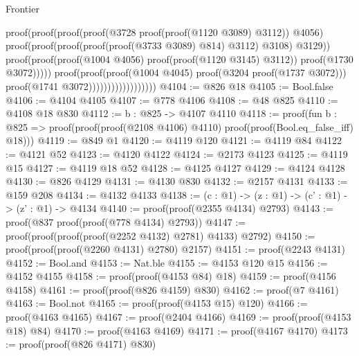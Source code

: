 \begin{lexlean}{Frontier}
\begin{coremodule}
                                                        proof(proof(proof(proof(@3728
                                                                  proof(proof(@1120 @3089) @3112))
                                                                @4056)
                                                              proof(proof(proof(proof(proof(@3733
                                                                          @3089)
                                                                        @814)
                                                                      @3112)
                                                                    @3108)
                                                                  @3129))
                                                            proof(proof(proof(@1004 @4056)
                                                                  proof(proof(@1120 @3145) @3112))
                                                                proof(@1730 @3072)))))
                                                  proof(proof(proof(@1004 @4045)
                                                        proof(@3204 proof(@1737 @3072)))
                                                      proof(@1741 @3072))))))))))))))))))
@4104 := @826 @18
@4105 := Bool.false
@4106 := @4104 @4105
@4107 := @778 @4106
@4108 := @48 @825
@4110 := @4108 @18 @830
@4112 := {b : @825} -> @4107 @4110
@4118 := proof(fun {b : @825} =>
    proof(proof(proof(@2108 @4106) @4110) proof(proof(Bool.eq_false_iff) @18)))
@4119 := @849 @1
@4120 := @4119 @120
@4121 := @4119 @84
@4122 := @4121 @52
@4123 := @4120 @4122
@4124 := @2173 @4123
@4125 := @4119 @15
@4127 := @4119 @18 @52
@4128 := @4125 @4127
@4129 := @4124 @4128
@4130 := @826 @4129
@4131 := @4130 @830
@4132 := @2157 @4131
@4133 := @159 @208
@4134 := @4132 @4133
@4138 := (c : @1) -> (z : @1) -> (c' : @1) -> (z' : @1) -> @4134
@4140 := proof(proof(@2355 @4134) @2793)
@4143 := proof(@837 proof(proof(@778 @4134) @2793))
@4147 := proof(proof(proof(proof(@2252 @4132) @2781) @4133) @2792)
@4150 := proof(proof(proof(@2260 @4131) @2780) @2157)
@4151 := proof(@2243 @4131)
@4152 := Bool.and
@4153 := Nat.ble
@4155 := @4153 @120 @15
@4156 := @4152 @4155
@4158 := proof(proof(@4153 @84) @18)
@4159 := proof(@4156 @4158)
@4161 := proof(proof(@826 @4159) @830)
@4162 := proof(@7 @4161)
@4163 := Bool.not
@4165 := proof(proof(@4153 @15) @120)
@4166 := proof(@4163 @4165)
@4167 := proof(@2404 @4166)
@4169 := proof(proof(@4153 @18) @84)
@4170 := proof(@4163 @4169)
@4171 := proof(@4167 @4170)
@4173 := proof(proof(@826 @4171) @830)

\end{coremodule}
\end{lexlean}
